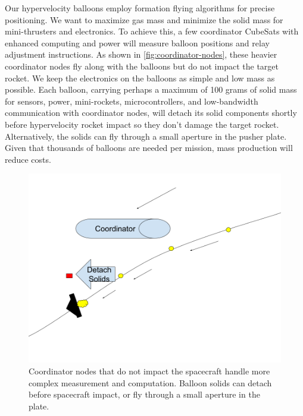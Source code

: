 \documentclass{article}
\begin{document}
Our hypervelocity balloons employ formation flying algorithms for precise positioning. We want to maximize gas mass and minimize the solid mass for mini-thrusters and electronics. To achieve this, a few coordinator CubeSats with enhanced computing and power will measure balloon positions and relay adjustment instructions.  As shown in \autoref{fig:coordinator-nodes}, these heavier coordinator nodes fly along with the balloons but do not impact the target rocket.  We keep the electronics on the balloons as simple and low mass as possible.   Each balloon, carrying perhaps a maximum of 100 grams of solid mass for sensors, power, mini-rockets, microcontrollers, and low-bandwidth communication with coordinator nodes, will detach its solid components shortly before hypervelocity rocket impact so they don't damage the target rocket.   Alternatively, the solids can fly through a small aperture in the pusher plate. Given that thousands of balloons are needed per mission, mass production will reduce costs.  

\begin{figure}
    \centering
    \includegraphics[width=0.5\linewidth]{images/Coordinator Nodes.png}
    \caption{Coordinator nodes that do not impact the spacecraft handle more complex measurement and computation.  Balloon solids can detach before spacecraft impact, or fly through a small aperture in the plate.}
    \label{fig:coordinator-nodes}
\end{figure}
\end{document}
